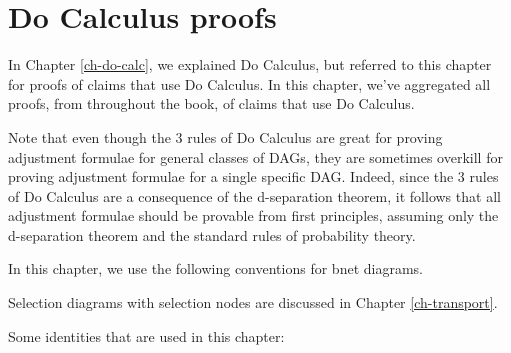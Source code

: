 \chapter{Do Calculus proofs}
\label{ch-do-calc-proofs}

In Chapter \ref{ch-do-calc},
we explained Do Calculus,
but referred to this
chapter for proofs
of claims that
use Do Calculus.
In this chapter, we've
aggregated
 all proofs, from
throughout the book,
of claims that use Do Calculus.

Note that even though the 3
rules of Do Calculus
are great for proving
adjustment formulae
for general classes of DAGs,
they are sometimes overkill
for proving
 adjustment formulae
for a single specific DAG.
Indeed, since the
 3 rules of Do Calculus
are a consequence
of the d-separation theorem, it follows that
all adjustment
formulae should be
provable from first principles,
assuming only
the d-separation theorem
and the standard rules of
probability theory.

In this chapter, we use the
 following conventions for bnet diagrams.

\bnetInstantiations

\hiddenNodes

Selection diagrams
with selection nodes 
 are discussed 
in Chapter \ref{ch-transport}.
\selectionGraphs

Some identities
that are used in this chapter:


